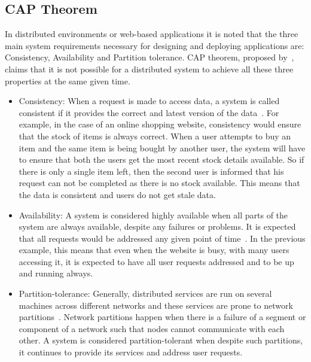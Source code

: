 \subsection{CAP Theorem} \label{ss:cap}
In distributed environments or web-based applications it is noted that the three
main system requirements necessary for designing and deploying applications are:
Consistency,   Availability and Partition tolerance.  CAP theorem,
proposed by~\citet{Brewer}, claims that it is not possible for a distributed system to
achieve all these three properties at the same given time.

\begin{itemize}
  
	\item Consistency: When a request is made to access data,   a system is called
	consistent if it provides the correct and latest version of the
	data~\citep{Tai,Wada,Ramakrishnan,browne,hp}.  For example, in the case of an
	online shopping website, consistency would ensure that the stock of items is
	always correct.  When a user attempts to buy an item and the same item is being
	bought by another user,   the system will have to ensure that both the users get
	the most recent stock details available.  So if there is only a single item
	left,   then the second user is informed that his request can not be completed
	as there is no stock available. This means that the data is consistent and users
	do not get stale data.
		
	\item Availability: A system is considered highly available when all parts of
	the system are always available, despite any failures or problems.  It is
	expected that all requests would be addressed any given point of
	time~\citep{browne,Tai,Wada,Ramakrishnan}.  In the previous example,   this
	means that even when the website is busy,   with many users accessing it,   it
	is expected to have all user requests addressed and to be up and running always.
			
	\item Partition-tolerance: Generally, distributed services are run on several
	machines across different networks and these services are prone to network
	partitions~\citep{Brewer,Ramakrishnan,Gilbert}. Network partitions happen when
	there is a failure of a segment or component of a network such that nodes cannot
	communicate with each other.
	A system is considered  partition-tolerant when despite such partitions,   it
	continues to provide its services and address user requests.
	
\end{itemize}

